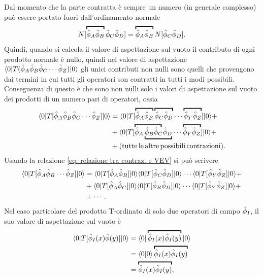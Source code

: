 Dal momento che la parte contratta è sempre un numero (in generale complesso) può essere portato fuori dall'ordinamento normale
\begin{equation}
    N[\contr{\hatphi_A\hatphi_B}\hatphi_C\hatphi_D]=\contr{\hatphi_A\hatphi_B}N[\hatphi_C\hatphi_D].
\end{equation}    
Quindi, quando si calcola il valore di aspettazione sul vuoto il contributo di ogni prodotto normale è nullo, quindi nel valore di aspettazione $\langle 0 | T(\hat{\phi}_A\hat{\phi}_B\hat{\phi}_C\cdots\hat{\phi}_Z) | 0 \rangle$ gli unici contributi non nulli sono quelli che provengono dai termini in cui tutti gli operatori son contratti in tutti i modi possibili. Conseguenza di questo è che sono non nulli solo i valori di aspettazione sul vuoto dei prodotti di un numero pari di operatori, ossia
\begin{equation}
    \begin{split}
        \mybrakett{0}{T[\hatphi_A\hatphi_B\hatphi_C\cdots\hatphi_Z]}{0}&=\mybrakett{0}{T[\contr{\hatphi_A\hatphi_B}\contr{\hatphi_C\hatphi_D}\cdots\contr{\hatphi_Y\hatphi_Z}]}{0}+ \\
        &+\mybrakett{0}{T[\mathrlap{\overbracket{\phantom{\hatphi_A\hatphi_B\hatphi_C}}}\hatphi_A\underbracket{\hatphi_B\hatphi_C\hatphi_D}\cdots\contr{\hatphi_Y\hatphi_Z}]}{0}+ \\
        &+(\mathrm{tutte\,le\,altre\,possibili\,contrazioni}).
    \end{split}
\end{equation}
Usando la relazione \eqref{eq: relazione tra contraz. e VEV} si può scrivere 
\begin{equation}
    \begin{split}
        \langle 0 | T[\hat{\phi}_A\hat{\phi}_B\cdots\hat{\phi}_Z] | 0 \rangle&=\langle 0 | T[\hat{\phi}_A\hat{\phi}_B] | 0 \rangle\langle 0 | T[\hat{\phi}_C\hat{\phi}_D] | 0 \rangle\cdots\langle 0 | T[\hat{\phi}_Y\hat{\phi}_Z] | 0 \rangle+ \\
            &+\langle 0 | T[\hat{\phi}_A\hat{\phi}_C] | 0 \rangle\langle 0 | T[\hat{\phi}_B\hat{\phi}_D] | 0 \rangle\cdots\langle 0 | T[\hat{\phi}_Y\hat{\phi}_Z] | 0 \rangle+\\
            &+ \cdots.
    \end{split}
\end{equation}
Nel caso particolare del prodotto T-ordinato di solo due operatori di campo $\hat{\phi}_I$, il suo valore di aspettazione sul vuoto è
\begin{equation}
    \begin{split}
        \mybrakett{0}{T[\hatphi_I(x)\hatphi(y)]}{0} &= \mybrakett{0}{\contr{\hatphi_I(x)\hatphi_I(y)}}{0} \\
        &= \mybraket{0}{0}\contr{\hatphi_I(x)\hatphi_I(y)} \\ 
        &= \contr{\hatphi_I(x)\hatphi_I(y)},
    \end{split}
\end{equation}
